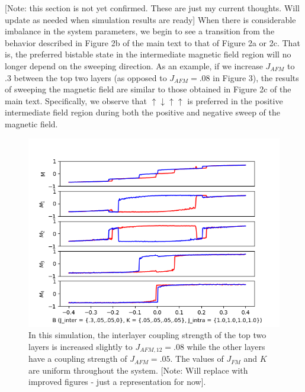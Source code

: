 \documentclass[10pt]{article}
\begin{document}
[Note: this section is not yet confirmed. These are just my current thoughts. Will update as needed when simulation results are ready] When there is considerable imbalance in the system
parameters, we begin to see a transition from the behavior described in Figure 2b of the main text to that of Figure 2a or 2c. That is, the preferred bistable state in the intermediate magnetic field region
will no longer depend on the sweeping direction. As an example, if we increase $J_{AFM}$ to $.3$ between the top two layers (as opposed to $J_{AFM} = .08$ in Figure 3), the results of sweeping the magnetic field
are similar to those obtained in Figure 2c of the main text. Specifically, we observe that $\uparrow \downarrow \uparrow  \uparrow$ is preferred in the positive intermediate field region during both the positive
and negative sweep of the magnetic field.

\begin{figure}[!htb]
\includegraphics[width=\textwidth]{sim_92.png}
\caption{In this simulation, the interlayer coupling strength of the top two layers is increased slightly to $J_{AFM,12} = .08$ while the other layers have a coupling strength of $J_{AFM} = .05$. The values of
$J_{FM}$ and $K$ are uniform throughout the system. [Note: Will replace with improved figures - just a representation for now]. }
\end{figure}
\end{document}

